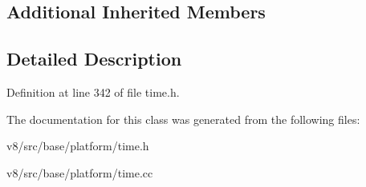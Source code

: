 \subsection*{Additional Inherited Members}


\subsection{Detailed Description}


Definition at line 342 of file time.\+h.



The documentation for this class was generated from the following files\+:\begin{DoxyCompactItemize}
\item 
v8/src/base/platform/time.\+h\item 
v8/src/base/platform/time.\+cc\end{DoxyCompactItemize}
